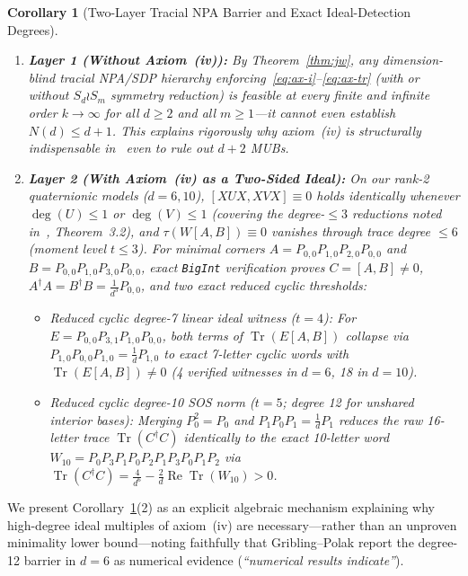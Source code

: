 \documentclass[11pt,a4paper]{article}
\newtheorem{corollary}[theorem]{Corollary}
\theoremstyle{definition}
\newcommand{\Tr}{\operatorname{Tr}}
\begin{document}
\begin{corollary}[Two-Layer Tracial NPA Barrier and Exact Ideal-Detection Degrees]
\label{cor:two-layer}
\begin{enumerate}
  \item \textbf{Layer 1 (Without Axiom~(iv)):} By Theorem~\ref{thm:jw}, any dimension-blind tracial NPA/SDP hierarchy enforcing~\eqref{eq:ax-i}--\eqref{eq:ax-tr} (with or without $S_d \wr S_m$ symmetry reduction) is feasible at every finite and infinite order $k \to \infty$ for \emph{all} $d \ge 2$ and \emph{all} $m \ge 1$---it cannot even establish $N(d) \le d+1$. This explains rigorously why axiom~(iv) is structurally indispensable in~\cite{GriblingPolak2024} even to rule out $d+2$ MUBs.
  \item \textbf{Layer 2 (With Axiom~(iv) as a Two-Sided Ideal):} On our rank-2 quaternionic models ($d=6,10$), $[XUX,XVX] \equiv 0$ holds identically whenever $\deg(U) \le 1$ or $\deg(V) \le 1$ (covering the degree-$\le 3$ reductions noted in~\cite{GriblingPolak2024}, Theorem~3.2), and $\tau(W[A,B]) \equiv 0$ vanishes through trace degree $\le 6$ (moment level $t \le 3$). For minimal corners $A = P_{0,0} P_{1,0} P_{2,0} P_{0,0}$ and $B = P_{0,0} P_{1,0} P_{3,0} P_{0,0}$, exact \texttt{BigInt} verification proves $C = [A, B] \ne 0$, $A^\dagger A = B^\dagger B = \frac{1}{d^3} P_{0,0}$, and two exact reduced cyclic thresholds:
  \begin{itemize}
    \item \emph{Reduced cyclic degree-7 linear ideal witness} ($t=4$): For $E = P_{0,0} P_{3,1} P_{1,0} P_{0,0}$, both terms of $\Tr(E[A,B])$ collapse via $P_{1,0} P_{0,0} P_{1,0} = \frac{1}{d} P_{1,0}$ to exact 7-letter cyclic words with $\Tr(E[A,B]) \ne 0$ (4 verified witnesses in $d=6$, 18 in $d=10$).
    \item \emph{Reduced cyclic degree-10 SOS norm} ($t=5$; degree 12 for unshared interior bases): Merging $P_0^2 = P_0$ and $P_1 P_0 P_1 = \frac{1}{d} P_1$ reduces the raw 16-letter trace $\Tr(C^\dagger C)$ identically to the exact 10-letter word $W_{10} = P_0 P_3 P_1 P_0 P_2 P_1 P_3 P_0 P_1 P_2$ via $\Tr(C^\dagger C) = \frac{4}{d^6} - \frac{2}{d}\operatorname{Re}\Tr(W_{10}) > 0$.
  \end{itemize}
\end{enumerate}
\end{corollary}

We present Corollary~\ref{cor:two-layer}(2) as an explicit algebraic mechanism explaining why high-degree ideal multiples of axiom~(iv) are necessary---rather than an unproven minimality lower bound---noting faithfully that Gribling--Polak report the degree-12 barrier in $d=6$ as numerical evidence (\emph{``numerical results indicate''}).
\end{document}
